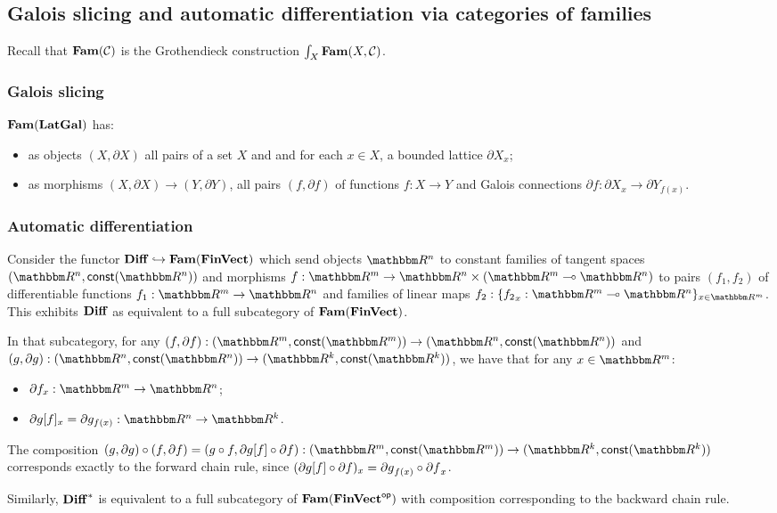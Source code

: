 \subsection{Galois slicing and automatic differentiation via categories of families}
\label{sec:galois-slicing-auto-diff-via-fam}

Recall that $\mathbf{Fam}(\mathcal{C})$ is the Grothendieck construction $\int_{X}\mathbf{Fam}(X, \mathcal{C})$.

\subsubsection{Galois slicing}
\label{sec:galois-slicing-auto-diff-via-fam:galois-slicing}

$\mathbf{Fam}(\mathbf{LatGal})$ has:
\begin{itemize}
\item as objects $(X, \partial X)$ all pairs of a set $X$ and and for each $x \in X$, a bounded lattice
$\partial X_x$;
\item as morphisms $(X, \partial X) \to (Y, \partial Y)$, all pairs $(f, \partial f)$ of functions $f: X \to
Y$ and Galois connections $\partial f: \partial X_x \to \partial Y_{f(x)}$.
\end{itemize}


\subsubsection{Automatic differentiation}
\label{sec:galois-slicing-auto-diff-via-fam:auto-diff}

Consider the functor $\mathbf{Diff} \hookrightarrow \mathbf{Fam}(\mathbf{FinVect})$ which send objects $\RR^n$ to constant families of
tangent spaces $(\RR^n, \const(\RR^n))$ and morphisms $f: \RR^m \to \RR^n \times (\RR^m \linearto \RR^n)$ to
pairs $(f_1, f_2)$ of differentiable functions $f_1: \RR^m \to \RR^n$ and families of linear maps $f_2:
\{{f_2}_x: \RR^m \linearto \RR^n\}_{x \in \RR^m}$. This exhibits $\mathbf{Diff}$ as equivalent to a full subcategory
of $\mathbf{Fam}(\mathbf{FinVect})$.

In that subcategory, for any $(f, \partial f): (\RR^m, \const(\RR^m)) \to (\RR^n, \const(\RR^n))$ and $(g,
\partial g): (\RR^n, \const(\RR^n)) \to (\RR^k, \const(\RR^k))$, we have that for any $x \in \RR^m$:
\begin{itemize}
\item $\partial f_x: \RR^m \to \RR^n$;
\item $\reindex{\partial g}{f}_x = \partial g_{f(x)}: \RR^n \to \RR^k$.
\end{itemize}

\noindent The composition $(g, \partial g) \comp (f, \partial f) = (g \comp f, \reindex{\partial g}{f} \comp
\partial f): (\RR^m, \const(\RR^m)) \to (\RR^k, \const(\RR^k))$ corresponds exactly to the forward chain rule,
since $(\partial g[f] \circ \partial f)_x = {\partial g}_{f(x)} \circ {\partial f}_x$.

Similarly, $\mathbf{Diff}^*$ is equivalent to a full subcategory of $\mathbf{Fam}(\mathbf{FinVect}^{\mathsf{op}})$ with composition
corresponding to the backward chain rule.

